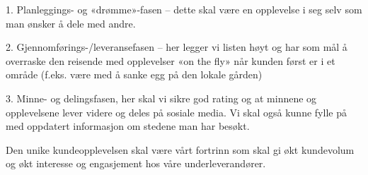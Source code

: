 \documentclass{article}
\begin{document}
1.     Planleggings- og «drømme»-fasen – dette skal være en opplevelse i seg selv som man ønsker å dele med andre.

2.     Gjennomførings-/leveransefasen – her legger vi listen høyt og har som mål å overraske den reisende med opplevelser «on the fly» når kunden først er i et område (f.eks. være med å sanke egg på den lokale gården)

3.     Minne- og delingsfasen, her skal vi sikre god rating og at minnene og opplevelsene lever videre og deles på sosiale media. Vi skal også kunne fylle på med oppdatert informasjon om stedene man har besøkt.

Den unike kundeopplevelsen skal være vårt fortrinn som skal gi økt kundevolum og økt interesse og engasjement hos våre underleverandører.

 

\newpage




\newpage

\end{document}
